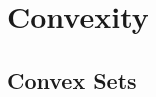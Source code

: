\section{Convexity} %
\label{sec:convexity}

\subsection{Convex Sets} %
\label{sub:convex_sets}




